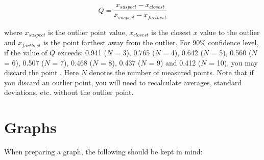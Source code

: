 \documentclass[byrevtex,amssymb,aps,pra,floatfix,letterpaper]{revtex4}
\begin{document}
\begin{equation}
\label{eq10a}
Q = \frac{x_{suspect} - x_{closest}}{x_{suspect} - x_{farthest}}
\end{equation}

\noindent
where $x_{suspect}$ is the outlier point value, $x_{closest}$ is the closest $x$ value to the outlier and $x_{farthest}$ is the point farthest away from the outlier. For 90\% confidence level, if the value of $Q$ exceeds: 0.941 ($N$ = 3), 0.765 ($N$ = 4), 0.642 ($N$ = 5), 0.560 ($N$ = 6), 0.507 ($N$ = 7), 0.468 ($N$ = 8), 0.437 ($N$ = 9) and 0.412 ($N$ = 10), you may discard the point \cite{MCBANE}. Here $N$ denotes the number of measured points. Note that if you discard an outlier point, you will need to recalculate averages, standard deviations, etc. without the outlier point.

\section{Graphs}

When preparing a graph, the following should be kept in mind:
\end{document}
